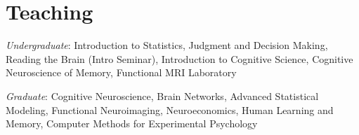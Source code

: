 \section*{Teaching}
\noindent

\textit{Undergraduate}: Introduction to Statistics, Judgment and Decision Making, Reading the Brain (Intro Seminar), Introduction to Cognitive Science, Cognitive Neuroscience of Memory, Functional MRI Laboratory \vspace{2mm}

\textit{Graduate}: Cognitive Neuroscience, Brain Networks, Advanced Statistical Modeling, Functional Neuroimaging, Neuroeconomics, Human Learning and Memory, Computer Methods for Experimental Psychology \vspace{2mm}

